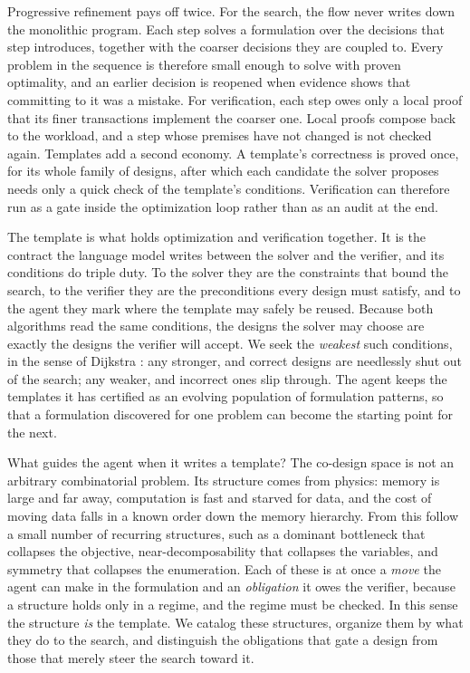 \documentclass[11pt]{article}
\begin{document}
Progressive refinement pays off twice. For the search, the flow never writes down the monolithic program. Each step solves a formulation over the decisions that step introduces, together with the coarser decisions they are coupled to. Every problem in the sequence is therefore small enough to solve with proven optimality, and an earlier decision is reopened when evidence shows that committing to it was a mistake. For verification, each step owes only a local proof that its finer transactions implement the coarser one. Local proofs compose back to the workload, and a step whose premises have not changed is not checked again. Templates add a second economy. A template's correctness is proved once, for its whole family of designs, after which each candidate the solver proposes needs only a quick check of the template's conditions. Verification can therefore run as a gate inside the optimization loop rather than as an audit at the end.

The template is what holds optimization and verification together. It is the contract the language model writes between the solver and the verifier, and its conditions do triple duty. To the solver they are the constraints that bound the search, to the verifier they are the preconditions every design must satisfy, and to the agent they mark where the template may safely be reused. Because both algorithms read the same conditions, the designs the solver may choose are exactly the designs the verifier will accept. We seek the \emph{weakest} such conditions, in the sense of Dijkstra \cite{r12}: any stronger, and correct designs are needlessly shut out of the search; any weaker, and incorrect ones slip through. The agent keeps the templates it has certified as an evolving population of formulation patterns, so that a formulation discovered for one problem can become the starting point for the next.

What guides the agent when it writes a template? The co-design space is not an arbitrary combinatorial problem. Its structure comes from physics: memory is large and far away, computation is fast and starved for data, and the cost of moving data falls in a known order down the memory hierarchy. From this follow a small number of recurring structures, such as a dominant bottleneck that collapses the objective, near-decomposability that collapses the variables, and symmetry that collapses the enumeration. Each of these is at once a \emph{move} the agent can make in the formulation and an \emph{obligation} it owes the verifier, because a structure holds only in a regime, and the regime must be checked. In this sense the structure \emph{is} the template. We catalog these structures, organize them by what they do to the search, and distinguish the obligations that gate a design from those that merely steer the search toward it.
\end{document}
